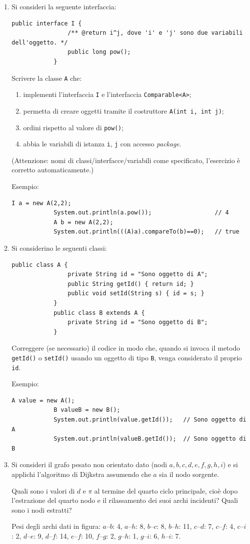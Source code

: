 \begin{enumerate}
		\item Si consideri la seguente interfaccia:
		\begin{lstlisting}[style=java]
			public interface I {
				/** @return i^j, dove 'i' e 'j' sono due variabili dell'oggetto. */
				public long pow();
			}
		\end{lstlisting}
		Scrivere la classe \texttt{A} che:
		\begin{enumerate}
			\item implementi l'interfaccia \texttt{I} e l'interfaccia \texttt{Comparable<A>};
			\item permetta di creare oggetti tramite il costruttore \texttt{A(int i, int j)};
			\item ordini rispetto al valore di \texttt{pow()};
			\item abbia le variabili di istanza \texttt{i}, \texttt{j} con accesso \emph{package}.
		\end{enumerate}
		(Attenzione: nomi di classi/interfacce/variabili come specificato, l'esercizio è corretto automaticamente.)
		
		Esempio:
		\begin{lstlisting}[style=java]
			I a = new A(2,2);
			System.out.println(a.pow());                  // 4
			A b = new A(2,2);
			System.out.println(((A)a).compareTo(b)==0);   // true
		\end{lstlisting}
		
		\item Si considerino le seguenti classi:
		\begin{lstlisting}[style=java]
			public class A {
				private String id = "Sono oggetto di A";
				public String getId() { return id; }
				public void setId(String s) { id = s; }
			}
			public class B extends A {
				private String id = "Sono oggetto di B";
			}
		\end{lstlisting}
		Correggere (se necessario) il codice in modo che, quando si invoca il metodo \texttt{getId()} o \texttt{setId()} usando un oggetto di tipo \texttt{B}, venga considerato il proprio \texttt{id}.
		
		Esempio:
		\begin{lstlisting}[style=java]
			A value = new A();
			B valueB = new B();
			System.out.println(value.getId());   // Sono oggetto di A
			System.out.println(valueB.getId());  // Sono oggetto di B
		\end{lstlisting}
		
		\item Si consideri il grafo pesato non orientato dato (nodi $a,b,c,d,e,f,g,h,i$) e si applichi l'algoritmo di Dijkstra assumendo che $a$ sia il nodo sorgente.
		
		Quali sono i valori di $d$ e $\pi$ al termine del quarto ciclo principale, cioè dopo l'estrazione del quarto nodo e il rilassamento dei suoi archi incidenti? Quali sono i nodi estratti?
		
		Pesi degli archi dati in figura: $a$--$b$: 4, $a$--$h$: 8, $b$--$c$: 8, $b$--$h$: 11, $c$--$d$: 7, $c$--$f$: 4, $c$--$i$: 2, $d$--$e$: 9, $d$--$f$: 14, $e$--$f$: 10, $f$--$g$: 2, $g$--$h$: 1, $g$--$i$: 6, $h$--$i$: 7.
	\end{enumerate}
	
